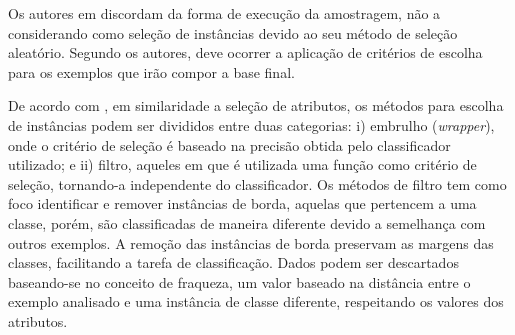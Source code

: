 Os autores em \cite{garcia2015data} discordam da forma de execução da amostragem, não a considerando como seleção de instâncias devido ao seu método de seleção aleatório. Segundo os autores, deve ocorrer a aplicação de critérios de escolha para os exemplos que irão compor a base final.

De acordo com , em similaridade a seleção de atributos, os métodos para escolha de instâncias podem ser divididos entre duas categorias: i) embrulho (\textit{wrapper}), onde o critério de seleção é baseado na precisão obtida pelo classificador utilizado; e ii) filtro, aqueles em que é utilizada uma função como critério de seleção, tornando\hyp{}a independente do classificador. Os métodos de filtro tem como foco identificar e remover instâncias de borda, aquelas que pertencem a uma classe, porém, são classificadas de maneira diferente devido a semelhança com outros exemplos. A remoção das instâncias de borda preservam as margens das classes, facilitando a tarefa de classificação. Dados podem ser descartados baseando-se no conceito de fraqueza, um valor baseado na distância entre o exemplo analisado e uma instância de classe diferente, respeitando os valores dos atributos.